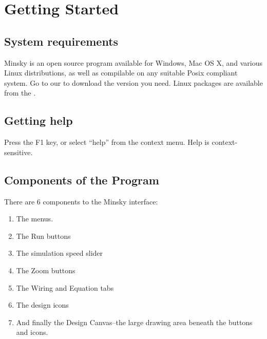 \chapter{Getting Started}

\section{System requirements}

Minsky is an open source program available for Windows, Mac OS X,
and various Linux distributions, as well as compilable on any suitable
Posix compliant system. Go to our  to download the version you need. Linux
packages are available from the .

\section{Getting help}

Press the F1 key, or select ``help'' from the context menu. Help is
context-sensitive.


\section{Components of the Program}

There are 6 components to the Minsky interface:

\begin{enumerate}
\item  The menus.


\item  The Run buttons


\item The simulation speed slider



\item The Zoom buttons


\item The Wiring and Equation tabs


\item The design icons



\item And finally the Design Canvas--the large drawing area beneath the buttons and icons.

\end{enumerate}

